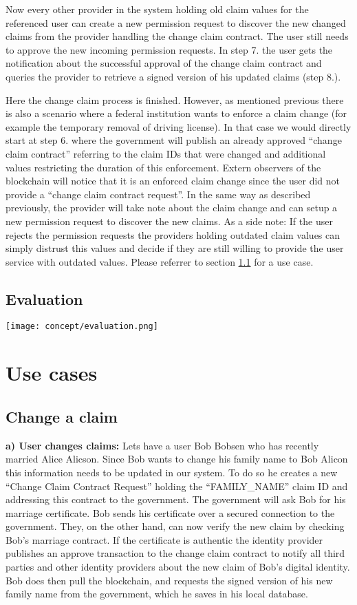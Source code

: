 Now every other provider in the system holding old claim values for the referenced user can create a new permission request to discover the new changed claims from the provider handling the change claim contract. The user still needs to approve the new incoming permission requests. In step 7. the user gets the notification about the successful approval of the change claim contract and queries the provider to retrieve a signed version of his updated claims (step 8.). 

Here the change claim process is finished. However, as mentioned previous there is also a scenario where a federal institution wants to enforce a claim change (for example the temporary removal of driving license). In that case we would directly start at step 6. where the government will publish an already approved “change claim contract” referring to the claim IDs that were changed and additional values restricting the duration of this enforcement. Extern observers of the blockchain will notice that it is an enforced claim change since the user did not provide a “change claim contract request”. In the same way as described previously, the provider will take note about the claim change and can setup a new permission request to discover the new claims. As a side note: If the user rejects the permission requests the providers holding outdated claim values can simply distrust this values and decide if they are still  willing to provide the user service with outdated values. Please referrer to section \ref{sec:changeClaimUseCase} for a use case.

\subsection{Evaluation}

\texttt{[image: concept/evaluation.png]}
 
\section{Use cases}

\subsection{Change a claim}
\label{sec:changeClaimUseCase}
\textbf{a) User changes claims:}
Lets have a user Bob Bobsen who has recently married Alice Alicson. Since Bob wants to change his family name to Bob Alicon this information needs to be updated in our system. To do so he creates a new “Change Claim Contract Request” holding the “FAMILY\_NAME” claim ID and addressing this contract to the government. The government will ask Bob for his marriage certificate. Bob sends his certificate over a secured connection to the government. They, on the other hand, can now verify the new claim by checking Bob's marriage contract. If the certificate is authentic the identity provider publishes an approve transaction to the change claim contract to notify all third parties and other identity providers about the new claim of Bob's digital identity.
Bob does then pull the blockchain, and requests the signed version of his new family name from the government, which he saves in his local database.

